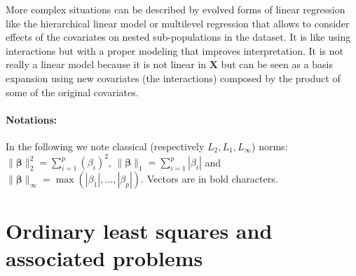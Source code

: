 \documentclass[12pt,a4paper]{report}
\begin{document}
	More complex situations can be described by evolved forms of linear regression like the hierarchical linear model \cite{raudenbush2002hierarchical,woltman2012introduction}  or  multilevel regression \cite{moerbeek2003comparison,maas2004robustness,hox1998multilevel} that allows to consider effects of the covariates on nested sub-populations in the dataset. It is like using interactions but with a proper modeling that improves interpretation. It is not really a linear model because it is not linear in $\boldsymbol{X}$ but can be seen as a basis expansion using new covariates (the interactions) composed by the product of some of the original covariates.
%			
%



\paragraph{Notations:}	
In the following we note classical (respectively $L_2,L_1,L_{\infty}$) norms: $\parallel\boldsymbol{\beta}\parallel_2^2=\sum_{i=1}^p(\beta_i)^2$, $\parallel\boldsymbol{\beta} \parallel_1=\sum_{i=1}^p|\beta_i| $ and $\parallel\boldsymbol{\beta} \parallel_{\infty}=\operatorname{max}(|\beta_1|,\dots,|\beta_p|)$. Vectors are in bold characters.
	\section{Ordinary least squares and associated problems}\label{sectionOLS}		%
\end{document}
